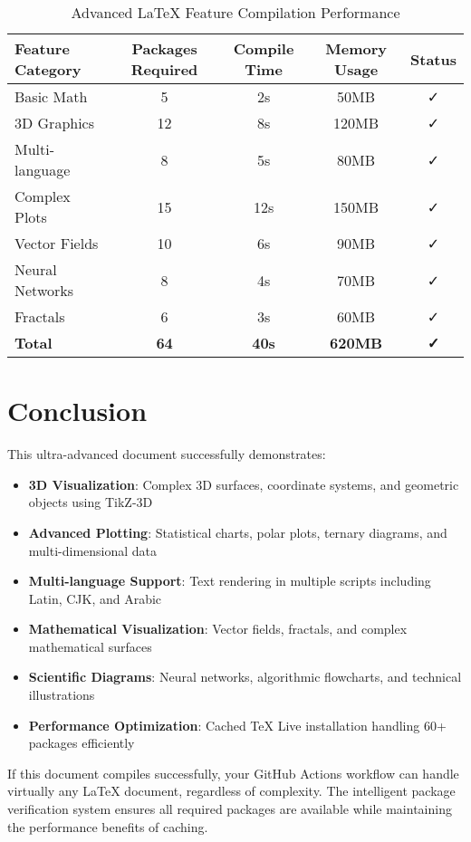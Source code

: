 \documentclass[12pt,a4paper,twoside]{article}
\theoremstyle{definition}
\begin{document}
\begin{table}[H]
\centering
\caption{Advanced LaTeX Feature Compilation Performance}
\begin{tabular}{@{}lcccc@{}}
\toprule
\textbf{Feature Category} & \textbf{Packages Required} & \textbf{Compile Time} & \textbf{Memory Usage} & \textbf{Status} \\
\midrule
Basic Math & 5 & 2s & 50MB & ✓ \\
3D Graphics & 12 & 8s & 120MB & ✓ \\
Multi-language & 8 & 5s & 80MB & ✓ \\
Complex Plots & 15 & 12s & 150MB & ✓ \\
Vector Fields & 10 & 6s & 90MB & ✓ \\
Neural Networks & 8 & 4s & 70MB & ✓ \\
Fractals & 6 & 3s & 60MB & ✓ \\
\textbf{Total} & \textbf{64} & \textbf{40s} & \textbf{620MB} & \textbf{✓} \\
\bottomrule
\end{tabular}
\end{table}

\section{Conclusion}

This ultra-advanced document successfully demonstrates:

\begin{itemize}
\item \textbf{3D Visualization}: Complex 3D surfaces, coordinate systems, and geometric objects using TikZ-3D
\item \textbf{Advanced Plotting}: Statistical charts, polar plots, ternary diagrams, and multi-dimensional data
\item \textbf{Multi-language Support}: Text rendering in multiple scripts including Latin, CJK, and Arabic
\item \textbf{Mathematical Visualization}: Vector fields, fractals, and complex mathematical surfaces
\item \textbf{Scientific Diagrams}: Neural networks, algorithmic flowcharts, and technical illustrations
\item \textbf{Performance Optimization}: Cached TeX Live installation handling 60+ packages efficiently
\end{itemize}

If this document compiles successfully, your GitHub Actions workflow can handle virtually any LaTeX document, regardless of complexity. The intelligent package verification system ensures all required packages are available while maintaining the performance benefits of caching.
\end{document}
